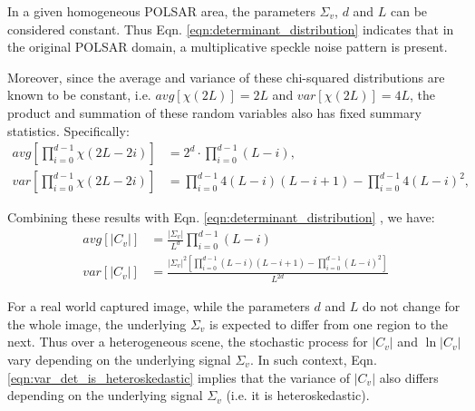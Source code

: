 \documentclass[journal]{IEEEtran}
\begin{document}
In a given homogeneous POLSAR area, the parameters $\Sigma_v$, $d$ and $L$ can be considered constant.
Thus Eqn. \ref{eqn:determinant_distribution} indicates that 
  in the original POLSAR domain, a multiplicative speckle noise pattern is present.

Moreover, since the average and variance of these chi-squared distributions %
  are known to be constant, i.e. $avg \left[ \chi(2L) \right] = 2L$ and $var \left[ \chi(2L) \right] = 4L$,
  the product and summation of these random variables also has fixed summary statistics.
Specifically:
{\footnotesize
\begin{align*}
  avg \left[ \prod^{d-1}_{i=0} \chi(2L-2i) \right] &= 2^d \cdot \prod^{d-1}_{i=0} (L-i), \\
  var \left[ \prod^{d-1}_{i=0} \chi(2L-2i) \right] &= \prod^{d-1}_{i=0} 4(L-i)(L-i+1) - \prod^{d-1}_{i=0} 4(L-i)^2, %
\end{align*}
}

Combining these results with Eqn. \ref{eqn:determinant_distribution} %
  , we have:
{\footnotesize
\begin{align}
  avg \left[ |C_v| \right]  &= \frac{|\Sigma_v|}{L^d} \prod^{d-1}_{i=0} (L-i)\\
  var \left[ |C_v| \right]  &=   \frac{|\Sigma_v|^2 \left[ \prod^{d-1}_{i=0} (L-i)(L-i+1) - \prod^{d-1}_{i=0} (L-i)^2 \right] }{L^{2d}} \label{eqn:var_det_is_heteroskedastic}%
\end{align}
}

For a real world captured image, while the parameters $d$ and $L$ do not change for the whole image,
  the underlying $\Sigma_v$ is expected to differ from one region to the next.
Thus over a heterogeneous scene, the stochastic process for $|C_v|$ and $\ln |C_v|$ vary depending on the underlying signal $\Sigma_v$. 
In such context, Eqn. \ref{eqn:var_det_is_heteroskedastic} implies that the variance of $|C_v|$ also differs depending on the underlying signal $\Sigma_v$ (i.e. it is   heteroskedastic).
\end{document}

